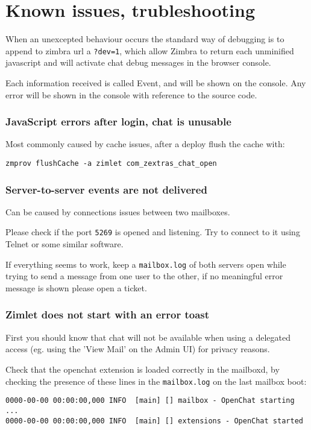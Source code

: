 \chapter{Known issues, trubleshooting}

When an unexcepted behaviour occurs the standard way of debugging is to append to zimbra url a \verb!?dev=1!, which allow
 Zimbra to return each unminified javascript and will activate chat debug messages in the browser console.

Each information received is called Event, and will be shown on the console. Any error will be shown in the console with
 reference to the source code.

\subsection{JavaScript errors after login, chat is unusable}
Most commonly caused by cache issues, after a deploy flush the cache with:
\begin{verbatim}
zmprov flushCache -a zimlet com_zextras_chat_open
\end{verbatim}

\subsection{Server-to-server events are not delivered}
Can be caused by connections issues between two mailboxes.

Please check if the port \verb!5269! is opened and listening. Try to connect to it using Telnet or some similar software.

If everything seems to work, keep a \verb!mailbox.log! of both servers open while trying to send a message from one user
to the other, if no meaningful error message is shown please open a ticket.

\subsection{Zimlet does not start with an error toast}
First you should know that chat will not be available when using a delegated access (eg. using the 'View Mail' on the Admin UI)
for privacy reasons.

Check that the openchat extension is loaded correctly in the mailboxd, by checking the presence of these lines in the
\verb!mailbox.log! on the last mailbox boot:
\begin{verbatim}
0000-00-00 00:00:00,000 INFO  [main] [] mailbox - OpenChat starting ...
0000-00-00 00:00:00,000 INFO  [main] [] extensions - OpenChat started
\end{verbatim}
